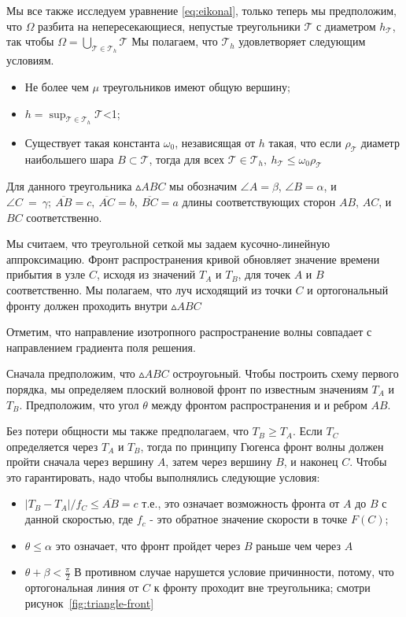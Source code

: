 Мы все также исследуем уравнение \eqref{eq:eikonal}, только теперь мы
предположим, что $\Omega$ разбита на непересекающиеся, непустые
треугольники $\mathcal{T}$ с диаметром $h_{\mathcal{T}}$, так чтобы
$\Omega = \bigcup_{\mathcal{T}\in \mathcal{T}_h}\mathcal{T}$ Мы
полагаем, что $\mathcal{T}_h$ удовлетворяет следующим условиям.
\begin{itemize}
\item Не более чем $\mu$ треугольников имеют общую вершину;
\item $h = \sup_{\mathcal{T} \in \mathcal{T}_h}\mathcal{T}$<1;
\item Существует такая константа $\omega_0$, независящая от $h$ такая,
  что если $\rho_{\mathcal{T}}$ диаметр наибольшего шара $B \subset
  \mathcal{T}$, тогда для всех $\mathcal{T} \in \mathcal{T}_h,\
  h_{\mathcal{T}} \le \omega_0 \rho_{\mathcal{T}}$
\end{itemize}

Для данного треугольника $\vartriangle ABC$ мы обозначим $\angle A =
\beta $, $\angle B = \alpha$, и $\angle C~=~\gamma;\ \overline{AB} =
c,\ \overline{AC} =b,\ \overline{BC} =a$ длины соответствующих сторон
$AB$, $AC$, и $BC$ соответственно.

Мы считаем, что треугольной сеткой мы задаем кусочно-линейную
аппроксимацию. Фронт распространения кривой обновляет значение времени
прибытия в узле $C$, исходя из значений $T_A$ и $T_B$, для точек $A$ и
$B$ соответственно. Мы полагаем, что луч исходящий из точки $C$ и
ортогональный фронту должен проходить внутри $\vartriangle ABC$

Отметим, что направление изотропного распространение волны совпадает с
направлением градиента поля решения.

Сначала предположим, что $\vartriangle ABC$ остроугоьный. Чтобы
построить схему первого порядка, мы определяем плоский волновой фронт
по известным значениям $T_A$ и $T_B$. Предположим, что угол $\theta$
между фронтом распространения и и ребром $AB$.

Без потери общности мы также предполагаем, что $T_B \ge T_A$. Если
$T_C$ определяется через $T_A$ и $T_B$, тогда по принципу Гюгенса
фронт волны должен пройти сначала через вершину $A$, затем через
вершину $B$, и наконец $C$. Чтобы это гарантировать, надо чтобы
выполнялись следующие условия:
\begin{itemize}
\item $|T_B-T_A| / f_C \le \overline{AB} = c$ т.е., это означает
  возможность фронта от $A$ до $B$ с данной скоростью, где $f_c$ - это
  обратное значение скорости в точке $F(C)$;
  \item $\theta \le \alpha$ это означает, что фронт пройдет через $B$
    раньше чем через $A$
  \item $\theta + \beta < \frac{\pi}{2}$ В противном случае нарушется
    условие причинности, потому, что ортогональная линия от $C$ к
    фронту проходит вне треугольника; смотри рисунок~\ref{fig:triangle-front}
\end{itemize}

